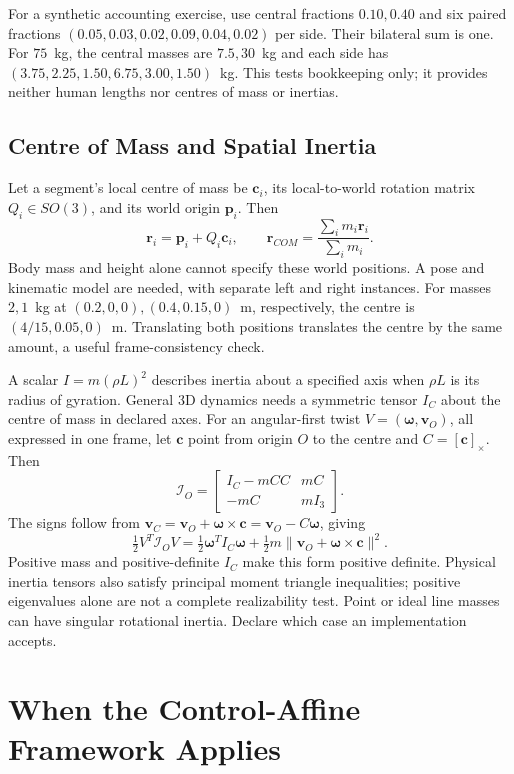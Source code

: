 For a synthetic accounting exercise, use central fractions $0.10,0.40$ and
six paired fractions $(0.05,0.03,0.02,0.09,0.04,0.02)$ per side. Their
bilateral sum is one. For $75$~kg, the central masses are $7.5,30$~kg and
each side has $(3.75,2.25,1.50,6.75,3.00,1.50)$~kg. This tests bookkeeping
only; it provides neither human lengths nor centres of mass or inertias.

\subsection{Centre of Mass and Spatial Inertia}

Let a segment's local centre of mass be $\bm c_i$, its local-to-world rotation
matrix $Q_i\in SO(3)$, and its world origin $\bm p_i$. Then
\[
 \bm r_i=\bm p_i+Q_i\bm c_i,\qquad
 \bm r_{COM}=\frac{\sum_i m_i\bm r_i}{\sum_i m_i}.
\]
Body mass and height alone cannot specify these world positions. A pose and
kinematic model are needed, with separate left and right instances. For
masses $2,1$~kg at $(0.2,0,0),(0.4,0.15,0)$~m, respectively, the centre
is $(4/15,0.05,0)$~m. Translating both positions translates the centre by
the same amount, a useful frame-consistency check.

A scalar $I=m(\rho L)^2$ describes inertia about a specified axis when
$\rho L$ is its radius of gyration. General 3D dynamics needs a symmetric
tensor $I_C$ about the centre of mass in declared axes. For an angular-first
twist $V=(\bm\omega,\bm v_O)$, all expressed in one frame, let $\bm c$
point from origin $O$ to the centre and $C=[\bm c]_\times$. Then
\[
 \mathcal I_O=\begin{bmatrix}I_C-mCC&mC\\-mC&mI_3\end{bmatrix}.
\]
The signs follow from
$\bm v_C=\bm v_O+\bm\omega\times\bm c=\bm v_O-C\bm\omega$, giving
\[
 \tfrac12 V^T\mathcal I_OV
 =\tfrac12\bm\omega^TI_C\bm\omega
  +\tfrac12m\|\bm v_O+\bm\omega\times\bm c\|^2.
\]
Positive mass and positive-definite $I_C$ make this form positive definite.
Physical inertia tensors also satisfy principal moment triangle inequalities;
positive eigenvalues alone are not a complete realizability test. Point or
ideal line masses can have singular rotational inertia. Declare which case
an implementation accepts.

\section{When the Control-Affine Framework Applies}

